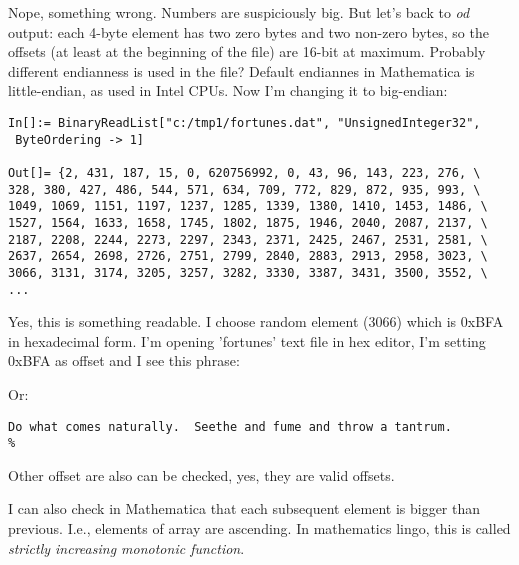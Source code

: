 Nope, something wrong. Numbers are suspiciously big.
But let's back to \emph{od} output: each 4-byte element has two zero bytes and two non-zero bytes,
so the offsets (at least at the beginning of the file) are 16-bit at maximum.
Probably different endianness is used in the file?
Default endiannes in Mathematica is little-endian, as used in Intel CPUs.
Now I'm changing it to big-endian:

\begin{lstlisting}[style=custommath]
In[]:= BinaryReadList["c:/tmp1/fortunes.dat", "UnsignedInteger32", 
 ByteOrdering -> 1]

Out[]= {2, 431, 187, 15, 0, 620756992, 0, 43, 96, 143, 223, 276, \
328, 380, 427, 486, 544, 571, 634, 709, 772, 829, 872, 935, 993, \
1049, 1069, 1151, 1197, 1237, 1285, 1339, 1380, 1410, 1453, 1486, \
1527, 1564, 1633, 1658, 1745, 1802, 1875, 1946, 2040, 2087, 2137, \
2187, 2208, 2244, 2273, 2297, 2343, 2371, 2425, 2467, 2531, 2581, \
2637, 2654, 2698, 2726, 2751, 2799, 2840, 2883, 2913, 2958, 3023, \
3066, 3131, 3174, 3205, 3257, 3282, 3330, 3387, 3431, 3500, 3552, \
...
\end{lstlisting}

Yes, this is something readable.
I choose random element (3066) which is 0xBFA in hexadecimal form.
I'm opening 'fortunes' text file in hex editor, I'm setting 0xBFA as offset and I see this phrase:



Or:

\begin{lstlisting}
Do what comes naturally.  Seethe and fume and throw a tantrum.
%
\end{lstlisting}

Other offset are also can be checked, yes, they are valid offsets.

I can also check in Mathematica that each subsequent element is bigger than previous.
I.e., elements of array are ascending.
In mathematics lingo, this is called \emph{strictly increasing monotonic function}.

